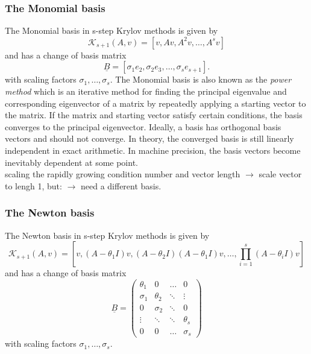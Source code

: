 \documentclass{scrartcl}
\numberwithin{equation}{section}
\begin{document}
\subsubsection{The Monomial basis}
The Monomial basis in s-step Krylov methods is given by 
\begin{equation*}
\mathcal{K}_{s + 1}(A, v) = [v, Av, A^2v, \ldots, A^sv]
\end{equation*}
and has a change of basis matrix
\begin{equation*}
\underline{B} = [\sigma_1 e_2, \sigma_2 e_3, \ldots, \sigma_s e_{s + 1}].
\end{equation*}
with scaling factors $\sigma_1, \ldots, \sigma_s$.
The Monomial basis is also known as the \textit{power method} which is an iterative method for finding the principal eigenvalue and corresponding eigenvector of a matrix by repeatedly applying a starting vector to the matrix. If the matrix and starting vector satisfy certain conditions, the basis converges to the principal eigenvector. Ideally, a basis has orthogonal basis vectors and should not converge. In theory, the converged basis is still linearly independent in exact arithmetic. In machine precision, the basis vectors become inevitably dependent at some point. \\

scaling the rapidly growing condition number and vector length $\rightarrow$ scale vector to lengh 1, but:  $\rightarrow$ need a different basis.
\subsubsection{The Newton basis}
The Newton basis in s-step Krylov methods is given by 
\begin{equation*}
\mathcal{K}_{s + 1}(A, v) = \left[v, (A - \theta_1 I )v, (A - \theta_2 I )(A - \theta_1 I )v, \ldots, \displaystyle\prod_{i = 1}^s (A - \theta_i I )v\right]
\end{equation*}
and has a change of basis matrix
\begin{equation*}
\underline{B} = 
\begin{pmatrix}
\theta_1 & 0 & \ldots & 0 \\
\sigma_1 & \theta_2 & \ddots & \vdots \\
0 & \sigma_2 & \ddots & 0 \\
\vdots & \ddots & \ddots & \theta_s \\
0 & 0 & \ldots & \sigma_s 
\end{pmatrix}
\end{equation*}
with scaling factors $\sigma_1, \ldots, \sigma_s$.\\
\end{document}
